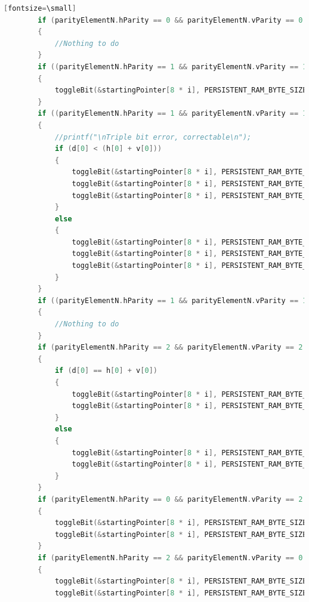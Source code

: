 \documentclass[LaM,binding=0.6cm]{../sapthesis}
\begin{document}
\begin{lstlisting}[language=c][fontsize=\small]
        if (parityElementN.hParity == 0 && parityElementN.vParity == 0 && parityElementN.dParity == 0)
        {
            //Nothing to do
        }
        if ((parityElementN.hParity == 1 && parityElementN.vParity == 1 && parityElementN.dParity == 1) && (d[0] == h[0] + v[0]))
        {
            toggleBit(&startingPointer[8 * i], PERSISTENT_RAM_BYTE_SIZE, h[0], v[0]);
        }
        if ((parityElementN.hParity == 1 && parityElementN.vParity == 1 && parityElementN.dParity == 1) && (d[0] != h[0] + v[0]))
        {
            //printf("\nTriple bit error, correctable\n");
            if (d[0] < (h[0] + v[0]))
            {
                toggleBit(&startingPointer[8 * i], PERSISTENT_RAM_BYTE_SIZE, h[0], v[0] - 1);
                toggleBit(&startingPointer[8 * i], PERSISTENT_RAM_BYTE_SIZE, h[0] - 1, v[0]);
                toggleBit(&startingPointer[8 * i], PERSISTENT_RAM_BYTE_SIZE, h[0] - 1, v[0] - 1);
            }
            else
            {
                toggleBit(&startingPointer[8 * i], PERSISTENT_RAM_BYTE_SIZE, h[0], v[0] + 1);
                toggleBit(&startingPointer[8 * i], PERSISTENT_RAM_BYTE_SIZE, h[0] + 1, v[0]);
                toggleBit(&startingPointer[8 * i], PERSISTENT_RAM_BYTE_SIZE, h[0] + 1, v[0] + 1);
            }
        }
        if ((parityElementN.hParity == 1 && parityElementN.vParity == 1 && parityElementN.dParity == 3) && (d[1] == h[0] + v[0]))
        {
            //Nothing to do
        }
        if (parityElementN.hParity == 2 && parityElementN.vParity == 2 && parityElementN.dParity == 2)
        {
            if (d[0] == h[0] + v[0])
            {
                toggleBit(&startingPointer[8 * i], PERSISTENT_RAM_BYTE_SIZE, h[0], v[0]);
                toggleBit(&startingPointer[8 * i], PERSISTENT_RAM_BYTE_SIZE, h[1], v[1]);
            }
            else
            {
                toggleBit(&startingPointer[8 * i], PERSISTENT_RAM_BYTE_SIZE, h[0], v[0]);
                toggleBit(&startingPointer[8 * i], PERSISTENT_RAM_BYTE_SIZE, h[1], v[1]);
            }
        }
        if (parityElementN.hParity == 0 && parityElementN.vParity == 2 && parityElementN.dParity == 2)
        {
            toggleBit(&startingPointer[8 * i], PERSISTENT_RAM_BYTE_SIZE, (d[0] - v[0]), v[0]);
            toggleBit(&startingPointer[8 * i], PERSISTENT_RAM_BYTE_SIZE, (d[1] - v[1]), v[1]);
        }
        if (parityElementN.hParity == 2 && parityElementN.vParity == 0 && parityElementN.dParity == 2)
        {
            toggleBit(&startingPointer[8 * i], PERSISTENT_RAM_BYTE_SIZE, h[0], (d[0] - h[0]));
            toggleBit(&startingPointer[8 * i], PERSISTENT_RAM_BYTE_SIZE, h[0], (d[1] - h[1]));

\end{lstlisting}
\end{document}

